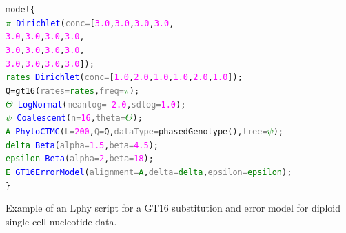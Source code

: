 \documentclass[10pt,letterpaper,table]{article}
\begin{document}
\begin{listing}
\small
\begin{alltt}
model \{
  \textcolor{green}{\(\pi\)}  ~ \textcolor{blue}{Dirichlet}(\textcolor{gray}{conc=}[\textcolor{magenta}{3.0}, \textcolor{magenta}{3.0}, \textcolor{magenta}{3.0}, \textcolor{magenta}{3.0},
  \quad \quad \quad \quad \quad \quad \quad \textcolor{magenta}{3.0}, \textcolor{magenta}{3.0}, \textcolor{magenta}{3.0}, \textcolor{magenta}{3.0}, 
  \quad \quad \quad \quad \quad \quad \quad \textcolor{magenta}{3.0}, \textcolor{magenta}{3.0}, \textcolor{magenta}{3.0}, \textcolor{magenta}{3.0}, 
  \quad \quad \quad \quad \quad \quad \quad \textcolor{magenta}{3.0}, \textcolor{magenta}{3.0}, \textcolor{magenta}{3.0}, \textcolor{magenta}{3.0}]);
  \textcolor{green}{rates} ~ \textcolor{blue}{Dirichlet}(\textcolor{gray}{conc=}[\textcolor{magenta}{1.0}, \textcolor{magenta}{2.0}, \textcolor{magenta}{1.0}, \textcolor{magenta}{1.0}, \textcolor{magenta}{2.0}, \textcolor{magenta}{1.0}]);
  Q = \textcolor{magenta!80!black}{gt16}(\textcolor{gray}{rates=}\textcolor{green}{rates}, \textcolor{gray}{freq=}\textcolor{green}{\(\pi\)});
  \textcolor{green}{\(\Theta\)} ~ \textcolor{blue}{LogNormal}(\textcolor{gray}{meanlog=}\textcolor{magenta}{-2.0}, \textcolor{gray}{sdlog=}\textcolor{magenta}{1.0});
  \textcolor{green}{\(\psi\)} ~ \textcolor{blue}{Coalescent}(\textcolor{gray}{n=}\textcolor{magenta}{16}, \textcolor{gray}{theta=}\textcolor{green}{\(\Theta\)});
  \textcolor{green}{A} ~ \textcolor{blue}{PhyloCTMC}(\textcolor{gray}{L=}\textcolor{magenta}{200}, \textcolor{gray}{Q=}Q, \textcolor{gray}{dataType=}\textcolor{magenta!80!black}{phasedGenotype}(), \textcolor{gray}{tree=}\textcolor{green}{\(\psi\)});
  \textcolor{green}{delta} ~ \textcolor{blue}{Beta}(\textcolor{gray}{alpha=}\textcolor{magenta}{1.5}, \textcolor{gray}{beta=}\textcolor{magenta}{4.5});
  \textcolor{green}{epsilon} ~ \textcolor{blue}{Beta}(\textcolor{gray}{alpha=}\textcolor{magenta}{2}, \textcolor{gray}{beta=}\textcolor{magenta}{18});
  \textcolor{green}{E} ~ \textcolor{blue}{GT16ErrorModel}(\textcolor{gray}{alignment=}\textcolor{green}{A}, \textcolor{gray}{delta=}\textcolor{green}{delta}, \textcolor{gray}{epsilon=}\textcolor{green}{epsilon});
\}
\end{alltt}
\caption{Example of an Lphy script for a GT16 substitution and error model for diploid single-cell nucleotide data.}
\end{listing}
\end{document}
